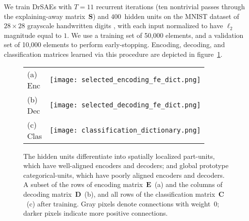 \documentclass{article} %
\newcommand{\C}{\mathbf{C}}
\newcommand{\D}{\mathbf{D}}
\newcommand{\E}{\mathbf{E}}
\newcommand{\Sm}{\mathbf{S}}
\begin{document}
We train DrSAEs with $T=11$ recurrent iterations (ten nontrivial passes through the explaining-away matrix~$\Sm$) and $400$~hidden units on the MNIST dataset of $28 \times 28$ grayscale handwritten digits \citep{lecun1998}, with each input normalized to have $\ell_2$ magnitude equal to $1$.  We use a training set of 50,000 elements, and a validation set of 10,000 elements to perform early-stopping.
Encoding, decoding, and classification matrices learned via this procedure are depicted in figure~\ref{dictionary_figure}.

\begin{figure}[tbp]
  \begin{center}
    \begin{tabular}{p{0.10in}p{5.2in}}
      \parbox[b]{0in}{(a) \\ Enc \vspace{0.2cm}} & \texttt{[image: selected\_encoding\_fe\_dict.png]} \\
      \parbox[b]{0in}{(b) \\ Dec \vspace{0.2cm}} & \texttt{[image: selected\_decoding\_fe\_dict.png]} \\
      \parbox[b]{0in}{(c) \\ Clas \vspace{0.2cm}} & \texttt{[image: classification\_dictionary.png]} \\
    \end{tabular}
  \end{center}
  \caption{The hidden units differentiate into spatially localized part-units, which have well-aligned encoders and decoders; and global prototype categorical-units, which have poorly aligned encoders and decoders.  A subset of the rows of encoding matrix~$\E$~(a) and the columns of decoding matrix~$\D$~(b), and all rows of the classification matrix~$\C$~(c) after training. Gray pixels denote connections with weight~$0$; darker pixels indicate more positive connections.\label{dictionary_figure}} %
\end{figure}


\end{document}

